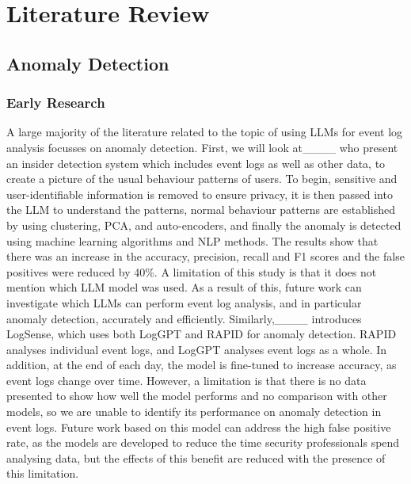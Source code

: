 \section{Literature Review}
\subsection{Anomaly Detection}
\subsubsection{Early Research}
A large majority of the literature related to the topic of using LLMs for event log analysis focusses on anomaly detection. First, we will look at____ who present an insider detection system which includes event logs as well as other data, to create a picture of the usual behaviour patterns of users. To begin, sensitive and user-identifiable information is removed to ensure privacy, it is then passed into the LLM to understand the patterns, normal behaviour patterns are established by using clustering, PCA, and auto-encoders, and finally the anomaly is detected using machine learning algorithms and NLP methods. The results show that there was an increase in the accuracy, precision, recall and F1 scores and the false positives were reduced by 40\%. A limitation of this study is that it does not mention which LLM model was used. As a result of this, future work can investigate which LLMs can perform event log analysis, and in particular anomaly detection, accurately and efficiently. Similarly,____ introduces LogSense, which uses both LogGPT and RAPID for anomaly detection. RAPID analyses individual event logs, and LogGPT analyses event logs as a whole. In addition, at the end of each day, the model is fine-tuned to increase accuracy, as event logs change over time. However, a limitation is that there is no data presented to show how well the model performs and no comparison with other models, so we are unable to identify its performance on anomaly detection in event logs. Future work based on this model can address the high false positive rate, as the models are developed to reduce the time security professionals spend analysing data, but the effects of this benefit are reduced with the presence of this limitation.

